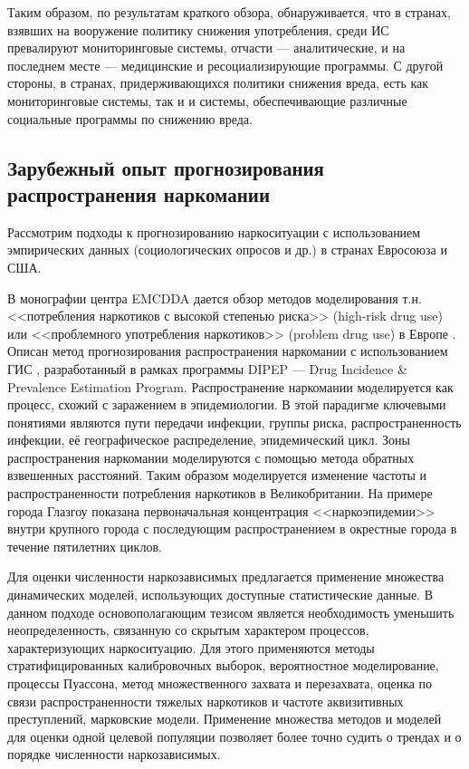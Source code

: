 Таким образом, по результатам краткого обзора, обнаруживается, что в странах, 
взявших на вооружение политику снижения употребления, среди ИС превалируют 
мониторинговые системы, отчасти --- аналитические, и на последнем месте --- 
медицинские и ресоциализирующие программы.
С другой стороны, в странах, придерживающихся политики снижения вреда, есть как 
мониторинговые системы, так и и системы, обеспечивающие различные социальные 
программы по снижению вреда.

\subsection{Зарубежный опыт прогнозирования распространения наркомании}

Рассмотрим подходы к прогнозированию наркоситуации с использованием эмпирических
данных (социологических опросов и др.) в странах Евросоюза и США.

В монографии центра EMCDDA дается обзор методов моделирования т.н. <<потребления
наркотиков с высокой степенью риска>> (high-risk drug use) или <<проблемного
употребления наркотиков>> (problem drug use) в Европе \cite{EMCDDA2001}. Описан
метод прогнозирования распространения наркомании с использованием ГИС
\cite{EMCDDA2001,Wiessing1999}, разработанный в рамках программы DIPEP --- Drug
Incidence \& Prevalence Estimation Program. Распространение наркомании
моделируется как процесс, схожий с заражением в эпидемиологии. В этой парадигме
ключевыми понятиями являются пути передачи инфекции, группы риска,
распространенность инфекции, её географическое распределение, эпидемический
цикл. Зоны распространения наркомании моделируются с помощью метода обратных
взвешенных расстояний. Таким образом моделируется изменение частоты и
распространенности потребления наркотиков в Великобритании.  На примере города
Глазгоу показана первоначальная концентрация <<наркоэпидемии>> внутри крупного
города с последующим распространением в окрестные города в течение пятилетних
циклов. 

Для оценки численности наркозависимых предлагается применение множества
динамических моделей, использующих доступные статистические данные. В данном
подходе основополагающим тезисом является необходимость уменьшить
неопределенность, связанную со скрытым характером процессов, характеризующих
наркоситуацию. Для этого применяются методы стратифицированных калибровочных
выборок, вероятностное моделирование, процессы Пуассона, метод множественного
захвата и перезахвата, оценка по связи распространенности тяжелых наркотиков и
частоте аквизитивных преступлений, марковские модели. Применение множества
методов и моделей для оценки одной целевой популяции позволяет более точно
судить о трендах и о порядке численности наркозависимых. 

